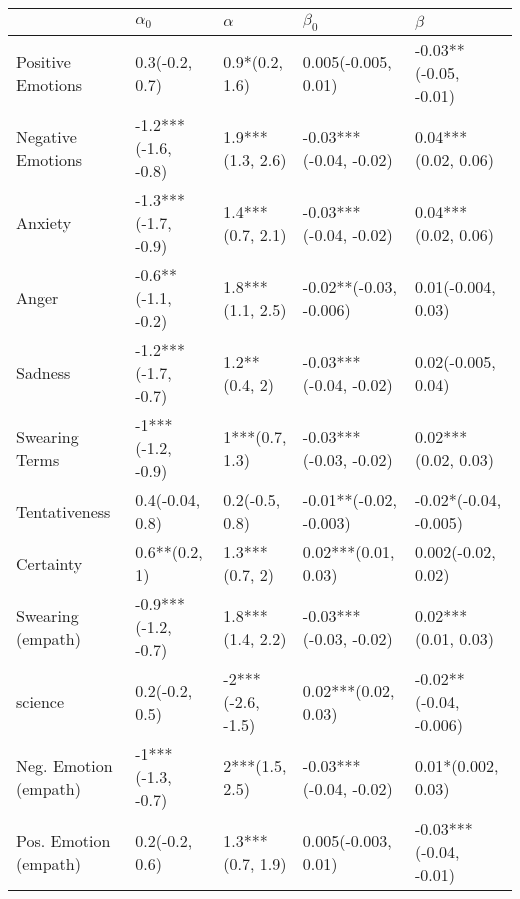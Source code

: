 \begin{tabular}{lllll}
\toprule
{} &           $\alpha_0$ &           $\alpha$ &               $\beta_0$ &                 $\beta$ \\
\midrule
Positive Emotions     &       0.3(-0.2, 0.7) &     0.9*(0.2, 1.6) &     0.005(-0.005, 0.01) &   -0.03**(-0.05, -0.01) \\
Negative Emotions     &  -1.2***(-1.6, -0.8) &   1.9***(1.3, 2.6) &  -0.03***(-0.04, -0.02) &     0.04***(0.02, 0.06) \\
Anxiety               &  -1.3***(-1.7, -0.9) &   1.4***(0.7, 2.1) &  -0.03***(-0.04, -0.02) &     0.04***(0.02, 0.06) \\
Anger                 &   -0.6**(-1.1, -0.2) &   1.8***(1.1, 2.5) &  -0.02**(-0.03, -0.006) &      0.01(-0.004, 0.03) \\
Sadness               &  -1.2***(-1.7, -0.7) &      1.2**(0.4, 2) &  -0.03***(-0.04, -0.02) &      0.02(-0.005, 0.04) \\
Swearing Terms        &    -1***(-1.2, -0.9) &     1***(0.7, 1.3) &  -0.03***(-0.03, -0.02) &     0.02***(0.02, 0.03) \\
Tentativeness         &      0.4(-0.04, 0.8) &     0.2(-0.5, 0.8) &  -0.01**(-0.02, -0.003) &   -0.02*(-0.04, -0.005) \\
Certainty             &        0.6**(0.2, 1) &     1.3***(0.7, 2) &     0.02***(0.01, 0.03) &      0.002(-0.02, 0.02) \\
Swearing (empath)     &  -0.9***(-1.2, -0.7) &   1.8***(1.4, 2.2) &  -0.03***(-0.03, -0.02) &     0.02***(0.01, 0.03) \\
science               &       0.2(-0.2, 0.5) &  -2***(-2.6, -1.5) &     0.02***(0.02, 0.03) &  -0.02**(-0.04, -0.006) \\
Neg. Emotion (empath) &    -1***(-1.3, -0.7) &     2***(1.5, 2.5) &  -0.03***(-0.04, -0.02) &      0.01*(0.002, 0.03) \\
Pos. Emotion (empath) &       0.2(-0.2, 0.6) &   1.3***(0.7, 1.9) &     0.005(-0.003, 0.01) &  -0.03***(-0.04, -0.01) \\
\bottomrule
\end{tabular}
